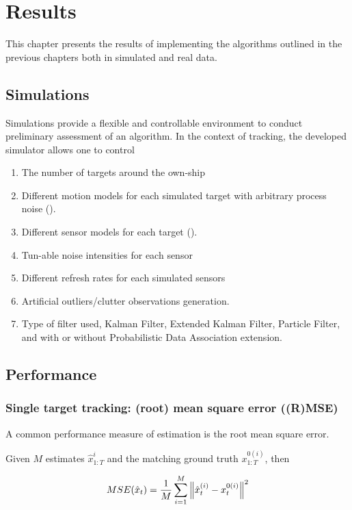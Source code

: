 \chapter{Results}\label{ch:Results}
This chapter presents the results of implementing the algorithms outlined in the previous chapters both in simulated and real data.

\section{Simulations}
Simulations provide a flexible and controllable environment to conduct preliminary assessment of an algorithm. In the context of tracking, the developed simulator allows one to control 
\begin{enumerate}[label=(\alph*)] 
	\item The number of targets around the own-ship
	\item Different motion models for each simulated target with arbitrary process noise ().
	\item Different sensor models for each target ().
	\item Tun-able noise intensities for each sensor
	\item Different refresh rates for each simulated sensors
	\item Artificial outliers/clutter observations generation.
	\item Type of filter used, \ie Kalman Filter, Extended Kalman Filter, Particle Filter, and with or without Probabilistic Data Association extension.
\end{enumerate}

\section{Performance}
\subsection{Single target tracking: (root) mean square error ((R)MSE)} \label{ssec:RMSE}
A common performance measure of estimation is the root mean square error. 

Given $M$ estimates $\hat{x}^{i}_{1:T}$ and the matching ground truth $x^{0(i)}_{1:T}$, then

\begin{equation}\label{RMSE}
	MSE(\hat{x}_t) = \frac{1}{M} \sum_{i=1}^{M} \left\lVert {\hat{x}_t^{(i)} - x_t^{0(i)}}\right\rVert^2
\end{equation}

